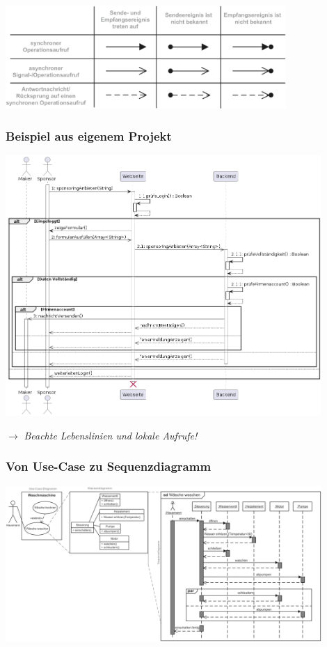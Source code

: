 \documentclass[11pt, a4paper]{article}
\begin{document}
\vspace{2em}

\centering \includegraphics[width=0.8\textwidth]{Sequenz-01.png}

\newpage

\raggedright \subsubsection*{Beispiel aus eigenem Projekt}

\centering \includegraphics[width=0.90\textwidth]{Sequenz-03.png}

\vspace{1em}

\raggedright $ \rightarrow $ \textit{Beachte Lebenslinien und lokale Aufrufe!}

\raggedright \subsubsection*{Von Use-Case zu Sequenzdiagramm}

\centering \includegraphics[width=0.90\textwidth]{Sequenz-04.png}
\end{document}
